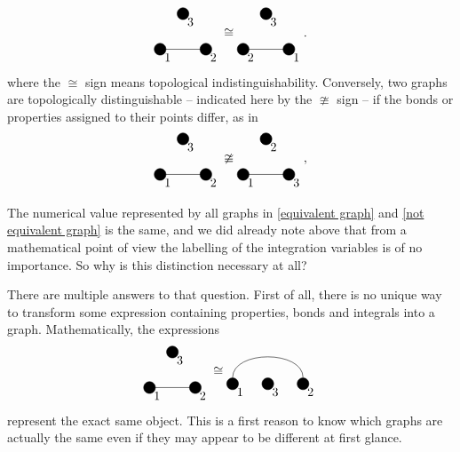 \documentclass[8.5pt,twoside,twocolumn]{article}
\theoremstyle{standard}
\newcommand\fp[2]{\draw {#1} node[circle,minimum size=0.2cm,draw,fill=black]
({#2}) {};} %
\begin{document}
\begin{equation}
\begin{tikzpicture}[baseline={(current bounding box.center)}]
  \exgraph{1}{2}{3}
\end{tikzpicture}
\cong
\begin{tikzpicture}[baseline={(current bounding box.center)}]
  \exgraph{2}{1}{3}
\end{tikzpicture}.
\label{equivalent graph}
\end{equation}
where the $\cong$ sign means topological indistinguishability. Conversely, two graphs are 
topologically distinguishable -- indicated here by the $\ncong$ sign -- if the bonds or
properties assigned to their points differ, as in 
\begin{equation}
\begin{tikzpicture}[baseline={(current bounding box.center)}]
  \exgraph{1}{2}{3}
  \end{tikzpicture}
\ncong
\begin{tikzpicture}[baseline={(current bounding box.center)}]
  \exgraph{1}{3}{2}
\end{tikzpicture},
\label{not equivalent graph}
\end{equation}

The numerical value represented by all graphs in \eqref{equivalent graph} and 
\eqref{not equivalent graph} is the same, and we did already note above that from a
mathematical point of view the labelling of the integration variables
is of no importance. So why is this distinction necessary at all?

There are multiple answers to that question. First of all, there is no unique
way to transform some expression containing properties, bonds and integrals into
a graph. Mathematically, the expressions
\begin{equation}
\begin{tikzpicture}[baseline={(current bounding box.center)}]
\exgraph{1}{2}{3}
\end{tikzpicture}
\cong
\begin{tikzpicture}[baseline={(current bounding box.center)}]
\fp{(0,0)} A
\fp{(1,0)} B
\fp{(2,0)} C
\foreach \x/\y in {A/1,B/3,C/2} {\node [below right] at (\x) {\y};}
\draw    (A) to[out=90,in=90] (C);
\end{tikzpicture}
\end{equation}
represent the exact same object. This is a first reason to know which graphs
are actually the same even if they may appear to be different at first glance.
\end{document}
